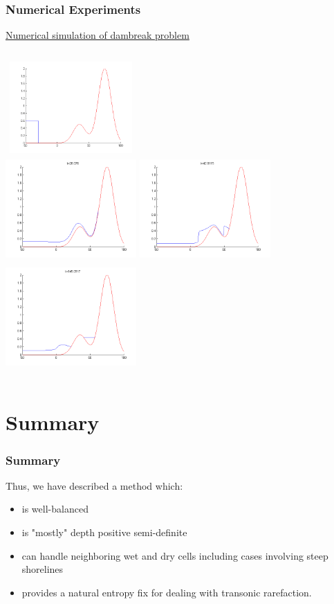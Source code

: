 \documentclass{beamer}
\begin{document}
{
\frametitle{Numerical Experiments}
\href{run:./dambreak.mp4}{Numerical simulation of dambreak problem}
\begin{columns}[t]
\centering
\includegraphics[width=5cm,height=3.5cm]{valley1.png}\\
\includegraphics[width=5cm,height=4cm]{valley2.png}
\centering
\includegraphics[width=5cm,height=4cm]{valley3.png}\\
\includegraphics[width=5cm,height=4cm]{valley4.png}
\end{columns}
}

\section{Summary}
\frame
{\frametitle{Summary}
Thus, we have described a method which:
\begin{itemize}
\item is well-balanced
\item is "mostly" depth positive semi-definite
\item can handle neighboring wet and dry cells including cases involving steep shorelines
\item provides a natural entropy fix for dealing with transonic rarefaction.
\end{itemize}
}
\end{document}
